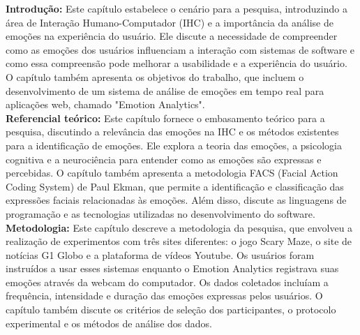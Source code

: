 %  
%  
%

\begin{resumo-portugues}

  \textbf{Introdução:} Este capítulo estabelece o cenário para a pesquisa, introduzindo a área de Interação Humano-Computador (IHC) e a importância da análise de emoções na experiência do usuário. Ele discute a necessidade de compreender como as emoções dos usuários influenciam a interação com sistemas de software e como essa compreensão pode melhorar a usabilidade e a experiência do usuário. O capítulo também apresenta os objetivos do trabalho, que incluem o desenvolvimento de um sistema de análise de emoções em tempo real para aplicações web, chamado "Emotion Analytics".
  \\

  \textbf{Referencial teórico:} Este capítulo fornece o embasamento teórico para a pesquisa, discutindo a relevância das emoções na IHC e os métodos existentes para a identificação de emoções. Ele explora a teoria das emoções, a psicologia cognitiva e a neurociência para entender como as emoções são expressas e percebidas. O capítulo também apresenta a metodologia FACS (Facial Action Coding System) de Paul Ekman, que permite a identificação e classificação das expressões faciais relacionadas às emoções. Além disso, discute as linguagens de programação e as tecnologias utilizadas no desenvolvimento do software.
  \\

  \textbf{Metodologia:} Este capítulo descreve a metodologia da pesquisa, que envolveu a realização de experimentos com três sites diferentes: o jogo Scary Maze, o site de notícias G1 Globo e a plataforma de vídeos Youtube. Os usuários foram instruídos a usar esses sistemas enquanto o Emotion Analytics registrava suas emoções através da webcam do computador. Os dados coletados incluíam a frequência, intensidade e duração das emoções expressas pelos usuários. O capítulo também discute os critérios de seleção dos participantes, o protocolo experimental e os métodos de análise dos dados.
  \\


\end{resumo-portugues}
